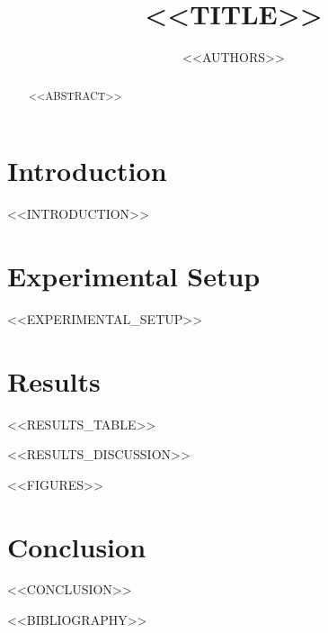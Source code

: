 \documentclass[10pt,twocolumn]{article}
\title{<<TITLE>>}
\author{<<AUTHORS>>}
\date{}
\begin{document}
\maketitle

\medskip

\begin{abstract}
<<ABSTRACT>>
\end{abstract}

\section{Introduction}
<<INTRODUCTION>>

\section{Experimental Setup}
<<EXPERIMENTAL_SETUP>>

\section{Results}
<<RESULTS_TABLE>>

<<RESULTS_DISCUSSION>>

<<FIGURES>>

\section{Conclusion}
<<CONCLUSION>>

<<BIBLIOGRAPHY>>
\end{document}
